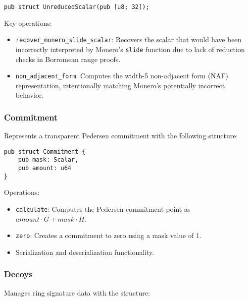 \documentclass[12pt,a4paper]{article}
\begin{document}
\begin{verbatim}
pub struct UnreducedScalar(pub [u8; 32]);
\end{verbatim}

Key operations:
\begin{itemize}
  \item \texttt{recover\_monero\_slide\_scalar}: Recovers the scalar that would have been incorrectly interpreted by Monero's \texttt{slide} function due to lack of reduction checks in Borromean range proofs. %
  \item \texttt{non\_adjacent\_form}: Computes the width-5 non-adjacent form (NAF) representation, intentionally matching Monero's potentially incorrect behavior. %
\end{itemize}

\subsubsection{Commitment}
Represents a transparent Pedersen commitment with the following structure: %

\begin{verbatim}
pub struct Commitment {
    pub mask: Scalar,
    pub amount: u64
}
\end{verbatim}

Operations:
\begin{itemize}
  \item \texttt{calculate}: Computes the Pedersen commitment point as $amount \cdot G + mask \cdot H$.  %
  \item \texttt{zero}: Creates a commitment to zero using a mask value of 1.  %
  \item Serialization and deserialization functionality.
\end{itemize}

\subsubsection{Decoys}
Manages ring signature data with the structure: %
\end{document}
